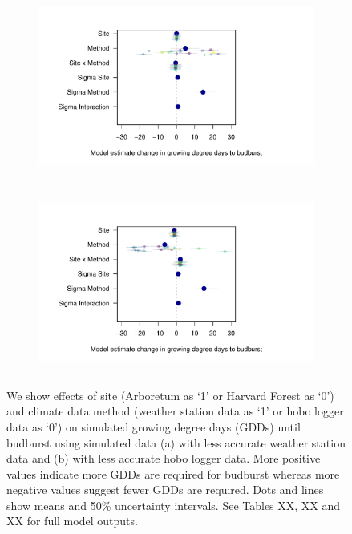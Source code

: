 \documentclass{article}\usepackage[]{graphicx}\usepackage[]{color}
\begin{document}
\begin{figure}[H]
  \begin{subfigure}{.5\textwidth}
    \caption{}
    \centering
    \includegraphics[height=6cm, width=10cm]{..//analyses/figures/muplot_noisyws.pdf}
    \label{fig:muplotnoisyws}
  \end{subfigure}%
    \begin{subfigure}{.5\textwidth}
      \caption{}
      \centering
      \includegraphics[height=6cm, width=10cm]{..//analyses/figures/muplot_noisyhobo.pdf}
    \label{fig:muplotnoisyhobo}
  \end{subfigure}
\caption{ We show effects of site (Arboretum as `1' or Harvard Forest as `0') and climate data method (weather station data as `1' or hobo logger data as `0') on simulated growing degree days (GDDs) until budburst using simulated data (a) with less accurate weather station data and (b) with less accurate hobo logger data. More positive values indicate more GDDs are required for budburst whereas more negative values suggest fewer GDDs are required. Dots and lines show means and 50\% uncertainty intervals. See Tables XX, XX and XX for full model outputs.}
\label{fig:simsmus}
\end{figure}
\end{document}
